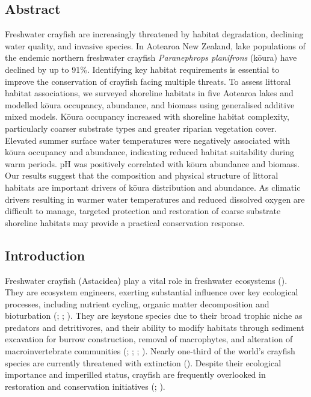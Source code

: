 \documentclass[
  letterpaper,
  DIV=11,
  numbers=noendperiod]{scrartcl}
\begin{document}
\subsection*{Abstract}\label{abstract}

Freshwater crayfish are increasingly threatened by habitat degradation,
declining water quality, and invasive species. In Aotearoa New Zealand,
lake populations of the endemic northern freshwater crayfish
\emph{Paranephrops planifrons} (kōura) have declined by up to 91\%.
Identifying key habitat requirements is essential to improve the
conservation of crayfish facing multiple threats. To assess littoral
habitat associations, we surveyed shoreline habitats in five Aotearoa
lakes and modelled kōura occupancy, abundance, and biomass using
generalised additive mixed models. Kōura occupancy increased with
shoreline habitat complexity, particularly coarser substrate types and
greater riparian vegetation cover. Elevated summer surface water
temperatures were negatively associated with kōura occupancy and
abundance, indicating reduced habitat suitability during warm periods.
pH was positively correlated with kōura abundance and biomass. Our
results suggest that the composition and physical structure of littoral
habitats are important drivers of kōura distribution and abundance. As
climatic drivers resulting in warmer water temperatures and reduced
dissolved oxygen are difficult to manage, targeted protection and
restoration of coarse substrate shoreline habitats may provide a
practical conservation response.

\subsection{Introduction}\label{introduction}

Freshwater crayfish (Astacidea) play a vital role in freshwater
ecosystems (). They are ecosystem
engineers, exerting substantial influence over key ecological processes,
including nutrient cycling, organic matter decomposition and
bioturbation (;
;
). They are keystone
species due to their broad trophic niche as predators and detritivores,
and their ability to modify habitats through sediment excavation for
burrow construction, removal of macrophytes, and alteration of
macroinvertebrate communities (; ;
;
). Nearly
one-third of the world's crayfish species are currently threatened with
extinction (). Despite
their ecological importance and imperilled status, crayfish are
frequently overlooked in restoration and conservation initiatives
(;
).
\end{document}
